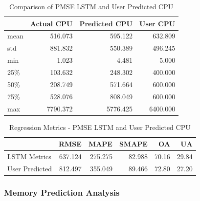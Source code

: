       \begin{table}
        \centering
        \caption{Comparison of PMSE LSTM and User Predicted CPU}
        \label{tab:comparison-pmse-lstm-user-predicted-cpu}

        \begin{tabular}{|l|rrr|}
          \toprule
          {} &  Actual CPU &  Predicted CPU &  User CPU \\
          \midrule
          mean &           516.073 &              595.122 &        632.809 \\
          std  &           881.832 &              550.389 &        496.245 \\
          min  &             1.023 &                4.481 &          5.000 \\
          25\%  &           103.632 &              248.302 &        400.000 \\
          50\%  &           208.749 &              571.664 &        600.000 \\
          75\%  &           528.076 &              808.049 &        600.000 \\
          max  &          7790.372 &             5776.425 &       6400.000 \\
          \bottomrule
        \end{tabular}
      \end{table}
      
      \begin{table}
        \centering
        \caption{Regression Metrics - PMSE LSTM and User Predicted CPU}
        \label{tab:regression-metrics-pmse-lstm-user-predicted-cpu}

        \begin{tabular}{|l|rrrrr|}
          \toprule
          {} &     RMSE &     MAPE &   SMAPE &     OA &     UA \\
          \midrule
          LSTM Metrics   &  637.124 &  275.275 &  82.988 &  70.16 &  29.84 \\
          User Predicted &  812.497 &  355.049 &  89.466 &  72.80 &  27.20 \\
          \bottomrule
        \end{tabular}
      \end{table}

    \subsubsection{Memory Prediction Analysis}
    \label{sec:mem-prediction-analysis-psme-lstm-evaluation}

